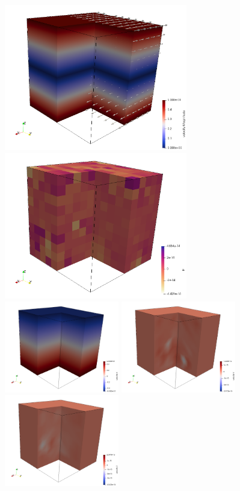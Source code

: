 \begin{center}
\includegraphics[width=8cm]{python_codes/fieldstone_81/results/bench2/vel}
\includegraphics[width=8cm]{python_codes/fieldstone_81/results/bench2/press}\\
\includegraphics[width=5cm]{python_codes/fieldstone_81/results/bench2/u}
\includegraphics[width=5cm]{python_codes/fieldstone_81/results/bench2/v}
\includegraphics[width=5cm]{python_codes/fieldstone_81/results/bench2/w}
\end{center}




